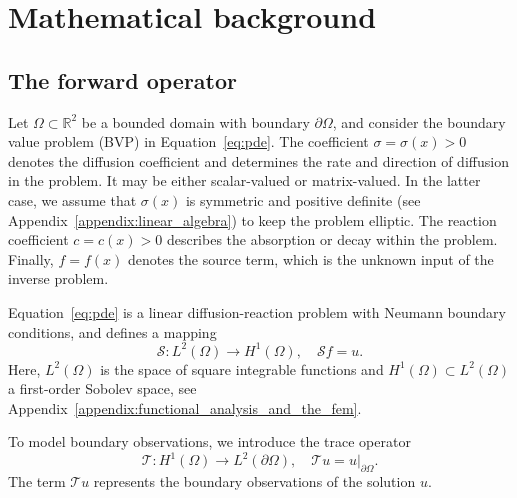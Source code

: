 \section{Mathematical background}\label{sec:mathematical_background}


\subsection{The forward operator}

Let $\Omega \subset \mathbb R^2$ be a bounded domain with boundary $\partial \Omega$, and consider the boundary value problem (BVP) in Equation~\eqref{eq:pde}. The coefficient $\sigma = \sigma(x) > 0$ denotes the diffusion coefficient and determines the rate and direction of diffusion in the problem. It may be either scalar-valued or matrix-valued. In the latter case, we assume that $\sigma(x)$ is symmetric and positive definite (see Appendix~\ref{appendix:linear_algebra}) to keep the problem elliptic. The reaction coefficient $c = c(x) > 0$ describes the absorption or decay within the problem. Finally, $f = f(x)$ denotes the source term, which is the unknown input of the inverse problem.
%
%
%
%
%

Equation~\eqref{eq:pde} is a linear diffusion-reaction problem with Neumann boundary conditions, and defines a mapping
\begin{equation}\label{eq:S_cont}
    \mathcal S: L^2(\Omega) \rightarrow H^1(\Omega), \quad \mathcal{S} f = u.
\end{equation}
Here, $L^2(\Omega)$ is the space of square integrable functions and $H^1(\Omega) \subset L^2(\Omega)$ a first-order Sobolev space, see Appendix~\ref{appendix:functional_analysis_and_the_fem}.
%
%
%

To model boundary observations, we introduce the trace operator
\begin{equation}\label{eq:trace}
    \mathcal T: H^1(\Omega) \rightarrow L^2(\partial\Omega), \quad \mathcal{T} u = u|_{\partial\Omega}.
\end{equation}
The term $\mathcal{T} u$ represents the boundary observations of the solution $u$.

